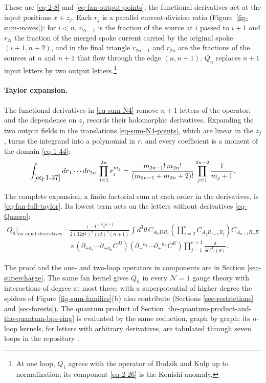 \documentclass[11pt]{article}
\numberwithin{equation}{section}
\numberwithin{figure}{section}
\numberwithin{table}{section}
\begin{document}
These are \eqref{eq-2-8} and \eqref{eq-fan-output-points}; the functional derivatives act at the input positions $x+z_j$. Each $r_j$ is a parallel current-division ratio (Figure~\ref{fig-sum-moves}): for $i<n$, $r_{2i-1}$ is the fraction of the source at $i$ passed to $i+1$ and $r_{2i}$ the fraction of the merged spoke current carried by the original spoke $(i+1,n+2)$, and in the final triangle $r_{2n-1}$ and $r_{2n}$ are the fractions of the sources at $n$ and $n+1$ that flow through the edge $(n,n+1)$. $Q_n$ replaces $n+1$ input letters by two output letters.\footnote{At one loop, $Q_1$ agrees with the operator of Budzik and Kulp \cite[Equations (3.64)--(3.70)]{BK} up to normalization; its component \eqref{eq-2-26} is the Konishi anomaly.}

\paragraph{Taylor expansion.}

The functional derivatives in \eqref{eq-sum-N4} remove $n+1$ letters of the operator, and the dependence on $z_j$ records their holomorphic derivatives. Expanding the two output fields in the translations \eqref{eq-sum-N4-points}, which are linear in the $z_j$, turns the integrand into a polynomial in $r$, and every coefficient is a moment of the domain \eqref{eq-1-44}:
\begin{equation}\label{eq-sum-moments}
\int_{\eqref{eq-1-37}}dr_1\cdots dr_{2n}\,\prod_{j=1}^{2n}r_j^{m_j}=\frac{m_{2n-1}!\,m_{2n}!}{(m_{2n-1}+m_{2n}+2)!}\prod_{j=1}^{2n-2}\frac1{m_j+1}.
\end{equation}

The complete expansion, a finite factorial sum at each order in the derivatives, is \eqref{eq-fan-full-taylor}. Its lowest term acts on the letters without derivatives \eqref{eq-Qnzero}:
\begin{equation}\label{eq-sum-Qnzero}
\begin{aligned}
Q_n\big|_{\text{no input derivatives}}
={}&\frac{(-1)^ni^{n+1}}{2(32\pi^2)^n(n!)^3(n+1)}
\int d^3\theta\,
C_{A_1DR_1}\left(\prod_{j=2}^nC_{A_jR_{j-1}R_j}\right)
C_{A_{n+1}R_nE}\\
&\times(\partial_{+\dot a_1}\cdots\partial_{+\dot a_n}C^D)
(\partial_+{}^{\dot a_1}\cdots\partial_+{}^{\dot a_n}C^E)
\prod_{j=1}^{n+1}\frac{\delta}{\delta C^{A_j}(\theta)}.
\end{aligned}
\end{equation}

The proof and the one- and two-loop operators in components are in Section \ref{sec-supercharge}. The same fan kernel gives $Q_n$ in every $\mathcal N=1$ gauge theory with interactions of degree at most three; with a superpotential of higher degree the spiders of Figure \ref{fig-sum-families}(b) also contribute (Sections \ref{sec-restrictions} and \ref{sec-forests}). The quantum product of Section \ref{the-quantum-product-and-the-quantum-bps-ring} is evaluated by the same reduction, graph by graph; its $n$-loop kernels, for letters with arbitrary derivatives, are tabulated through seven loops in the repository \cite{KernelRepo}.
\end{document}
